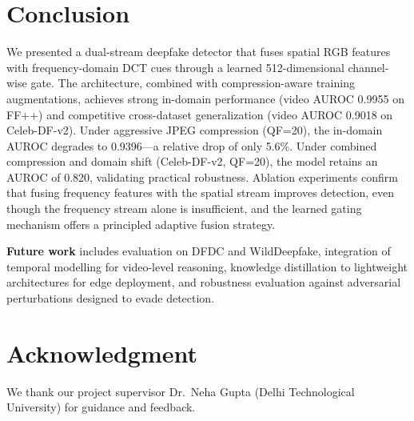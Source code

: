 \documentclass[conference]{IEEEtran}
\begin{document}
\section{Conclusion}

We presented a dual-stream deepfake detector that fuses spatial RGB features with frequency-domain DCT cues through a learned 512-dimensional channel-wise gate.
The architecture, combined with compression-aware training augmentations, achieves strong in-domain performance (video AUROC 0.9955 on FF++) and competitive cross-dataset generalization (video AUROC 0.9018 on Celeb-DF-v2).
Under aggressive JPEG compression (QF=20), the in-domain AUROC degrades to 0.9396---a relative drop of only 5.6\%.
Under combined compression and domain shift (Celeb-DF-v2, QF=20), the model retains an AUROC of 0.820, validating practical robustness.
Ablation experiments confirm that fusing frequency features with the spatial stream improves detection, even though the frequency stream alone is insufficient, and the learned gating mechanism offers a principled adaptive fusion strategy.

\textbf{Future work} includes evaluation on DFDC and WildDeepfake, integration of temporal modelling for video-level reasoning, knowledge distillation to lightweight architectures for edge deployment, and robustness evaluation against adversarial perturbations designed to evade detection.

\section*{Acknowledgment}
We thank our project supervisor Dr.\ Neha Gupta (Delhi Technological University) for guidance and feedback.



\end{document}
